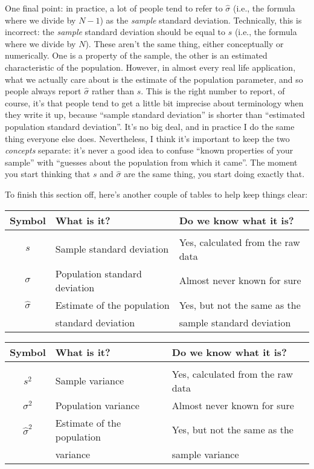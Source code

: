 One final point: in practice, a lot of people tend to refer to $\hat{\sigma}$ (i.e., the formula where we divide by $N-1$) as the {\it sample} standard deviation. Technically, this is incorrect: the {\it sample} standard deviation should be equal to $s$ (i.e., the formula where we divide by $N$). These aren't the same thing, either conceptually or numerically. One is a property of the sample, the other is an estimated characteristic of the population. However, in almost every real life application, what we actually care about is the estimate of the population parameter, and so people always report $\hat\sigma$ rather than $s$. This is the right number to report, of course, it's that people tend to get a little bit imprecise about terminology when they write it up, because ``sample standard deviation'' is shorter than ``estimated population standard deviation''. It's no big deal, and in practice I do the same thing everyone else does. Nevertheless, I think it's important to keep the two {\it concepts} separate: it's never a good idea to confuse ``known properties of your sample'' with ``guesses about the population from which it came''. The moment you start thinking that $s$ and $\hat\sigma$ are the same thing, you start doing exactly that. 

To finish this section off, here's another couple of tables to help keep things clear:

\begin{center}
\small 
\begin{tabular}{cll}
Symbol & What is it? & Do we know what it is? \\ \hline \\[-6pt]
$s$ & Sample standard deviation & Yes, calculated from the raw data \\
$\sigma$ & Population standard deviation & Almost never known for sure \\
$\hat{\sigma}$ & Estimate of the population  & Yes, but not the same as the  \\
 & standard deviation & sample standard deviation
\end{tabular}
\end{center}

\begin{center}
\small 
\begin{tabular}{cll}
Symbol & What is it? & Do we know what it is? \\ \hline \\[-6pt]
$s^2$ & Sample variance & Yes, calculated from the raw data \\
$\sigma^2$ & Population variance & Almost never known for sure \\
$\hat{\sigma}^2$ & Estimate of the population  & Yes, but not the same as the  \\
 & variance & sample variance
\end{tabular}
\end{center}




